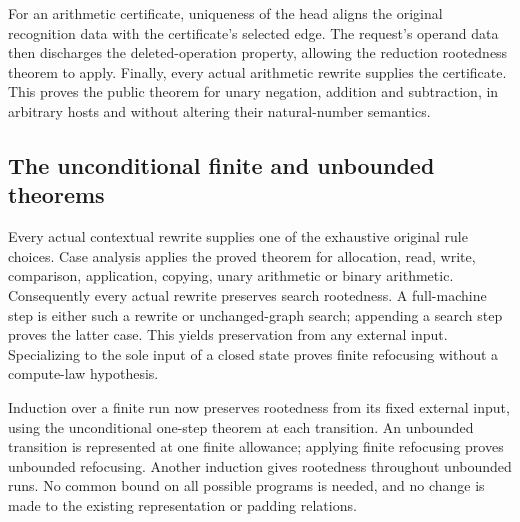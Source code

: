 For an arithmetic certificate, uniqueness of the head aligns the original
recognition data with the certificate's selected edge. The request's operand
data then discharges the deleted-operation property, allowing the reduction
rootedness theorem to apply. Finally, every actual arithmetic rewrite supplies
the certificate. This proves the public theorem for unary negation, addition
and subtraction, in arbitrary hosts and without altering their natural-number
semantics.



\subsection{The unconditional finite and unbounded theorems}

Every actual contextual rewrite supplies one of the exhaustive original rule
choices. Case analysis applies the proved theorem for allocation, read, write,
comparison, application, copying, unary arithmetic or binary arithmetic.
Consequently every actual rewrite preserves search rootedness. A full-machine
step is either such a rewrite or unchanged-graph search; appending a search
step proves the latter case. This yields preservation from any external input.
Specializing to the sole input of a closed state proves finite refocusing
without a compute-law hypothesis.




Induction over a finite run now preserves rootedness from its fixed external
input, using the unconditional one-step theorem at each transition. An
unbounded transition is represented at one finite allowance; applying finite
refocusing proves unbounded refocusing. Another induction gives rootedness
throughout unbounded runs. No common bound on all possible programs is needed,
and no change is made to the existing representation or padding relations.



